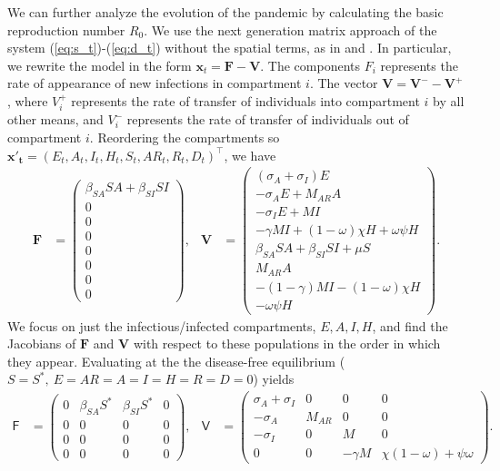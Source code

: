 \documentclass[11pt]{article}
\renewcommand\vec{\mathbf}
\newcommand{\mat}[1]{\mathsf{#1}}
\begin{document}
	We can further analyze the evolution of the pandemic by calculating the basic reproduction number $R_0$.
	We use the next generation matrix approach of the system (\ref{eq:s_t})-(\ref{eq:d_t}) without the spatial terms, as in \cite{Diekmann-1990} and \cite{VANDENDRIESSCHE200229}.
	In particular, we rewrite the model in the form $\vec{x}_t = \vec{F} - \vec{V}$.
	The components $F_i$ represents the rate of appearance of new infections in compartment $i$.
	The vector $\vec{V} = \vec{V}^- - \vec{V}^+$, where $V_i^+$ represents the rate of transfer of individuals into compartment $i$ by all other means, and $V_i^-$ represents the rate of transfer of individuals out of compartment $i$.
	Reordering the compartments so $\vec{x'_t} = (E_t, A_t, I_t, H_t, S_t, AR_t, R_t, D_t)^\intercal$, we have
	\begin{align*}
		\vec{F} &= \begin{pmatrix}
			\beta_{SA} S A + \beta_{SI} S I \\
			0 \\ 0 \\ 0 \\ 0 \\ 0 \\ 0 \\ 0
		\end{pmatrix}, &
		\vec{V} &= \begin{pmatrix}
			(\sigma_A +\sigma_I) E \\
			- \sigma_A E + M_{AR} A \\
			- \sigma_I E + M I \\
			- \gamma M I + (1 - \omega) \chi H + \omega \psi H \\
			\beta_{SA} S A + \beta_{SI} S I + \mu S \\
			M_{AR} A \\
			- (1 - \gamma) M I - (1 - \omega) \chi H \\
			- \omega \psi H
		\end{pmatrix}.
	\end{align*}
	We focus on just the infectious/infected compartments, $E, A, I, H$, and find the Jacobians of $\vec{F}$ and $\vec{V}$ with respect to these populations in the order in which they appear.
	Evaluating at the the disease-free equilibrium ($S = S^*, \ E = AR = A = I = H = R = D = 0$) yields
	\begin{align*}
		\mat{F} &= \begin{pmatrix}
			0 & \beta_{SA} S^* & \beta_{SI} S^* & 0 \\
			0 & 0 & 0 & 0 \\
			0 & 0 & 0 & 0 \\
			0 & 0 & 0 & 0
		\end{pmatrix}, &
		\mat{V} &= \begin{pmatrix}
			\sigma_A + \sigma_I & 0 & 0 & 0 \\
			- \sigma_A & M_{AR} & 0 & 0 \\
			- \sigma_I & 0 & M & 0 \\
			0 & 0 & - \gamma M & \chi (1 - \omega) + \psi \omega
		\end{pmatrix}.
	\end{align*}
\end{document}

